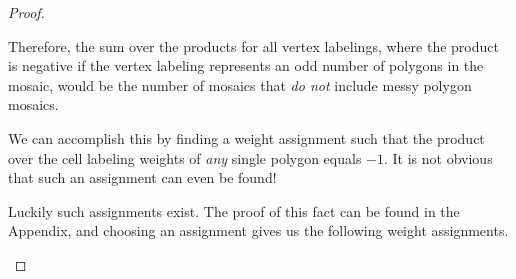 \documentclass[12pt]{article}
\theoremstyle{plain}
\theoremstyle{definition}
\theoremstyle{remark}
\theoremstyle{definition}
\newcommand{\cell}[4]{ \draw[thick] ( #1 , #2 ) rectangle ( #3 , #4 );}
\newcommand{\cellopen}[4]{ \draw[thick] ( #1 , #2 ) rectangle ( #3 , #4 ); \node[shape=circle,draw=red,fill=red, inner sep=0pt,minimum size=3pt] (A) at ( #1 * 0.5 + #3 * 0.5 , #2 * 0.5 + #4 * 0.5 ){};}
\newcommand{\cellA}[4]{\draw[red, thick, densely dotted] ( #1 + 0.5 , #2 ) arc(0:90:{0.5}); \draw[thick] ( #1 , #2 ) rectangle ( #3 , #4 );}
\newcommand{\cellB}[4]{\draw[red, thick, densely dotted] ( #1 + 1 , #2 + 0.5 ) arc(90:180:{0.5}); \draw[thick] ( #1 , #2 ) rectangle ( #3 , #4 );}
\newcommand{\cellC}[4]{\draw[red, thick, densely dotted] ( #1 + 0.5, #2 + 1 ) arc(180:270:{0.5}); \draw[thick] ( #1 , #2 ) rectangle ( #3 , #4 );}
\newcommand{\cellD}[4]{\draw[red, thick, densely dotted] ( #1 , #2 + 0.5 ) arc(-90:0:{0.5}); \draw[thick] ( #1 , #2 ) rectangle ( #3 , #4 );}
\newcommand{\lablvertex}[3]{\node[shape=circle,draw=none,fill=white, inner sep=2pt,minimum size=5pt] (A) at ( #1 , #2 ) {#3};}
\begin{document}
\begin{proof}
\begin{center}
\end{center}

Therefore, the sum over the products for all vertex labelings, where the product is negative if the vertex labeling represents an odd number of polygons in the mosaic, would be the number of mosaics that \textit{do not} include messy polygon mosaics.

We can accomplish this by finding a weight assignment such that the product over the cell labeling weights of \textit{any} single polygon equals $-1$. It is not obvious that such an assignment can even be found! 

Luckily such assignments exist. The proof of this fact can be found in the Appendix, and choosing an assignment gives us the following weight assignments.

\begin{center}
\end{center}
\end{proof}
\end{document}
